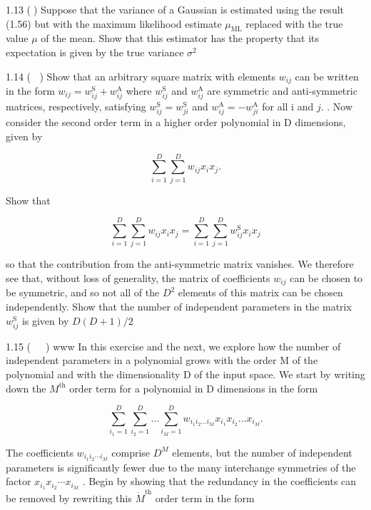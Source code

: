 \documentclass[
  10
]{article}
\begin{document}
1.13 () Suppose that the variance of a Gaussian is estimated using the
result (1.56) but with the maximum likelihood estimate
\(\mu _ { \mathrm { M L } }\) replaced with the true value \(\mu\) of
the mean. Show that this estimator has the property that its expectation
is given by the true variance \(\sigma ^ { 2 }\)

1.14 ( ) Show that an arbitrary square matrix with elements
\(w _ { i j }\) can be written in the form
\(w _ { i j } = w _ { i j } ^ { \mathrm { S } } + w _ { i j } ^ { \mathrm { A } }\)
where \(w _ { i j } ^ { \mathrm { S } }\) and
\(w _ { i j } ^ { \mathrm { A } }\) are symmetric and anti-symmetric
matrices, respectively, satisfying
\(w _ { i j } ^ { \mathrm { S } } = w _ { j i } ^ { \mathrm { S } }\)
and
\(w _ { i j } ^ { \mathrm { A } } = - w _ { j i } ^ { \mathrm { A } }\)
for all i and \(j .\) . Now consider the second order term in a higher
order polynomial in D dimensions, given by

\[
\sum_ {i = 1} ^ {D} \sum_ {j = 1} ^ {D} w _ {i j} x _ {i} x _ {j}.\tag{1.131}
\]

Show that

\[
\sum_ {i = 1} ^ {D} \sum_ {j = 1} ^ {D} w _ {i j} x _ {i} x _ {j} = \sum_ {i = 1} ^ {D} \sum_ {j = 1} ^ {D} w _ {i j} ^ {\mathrm{S}} x _ {i} x _ {j}\tag{1.132}
\]

so that the contribution from the anti-symmetric matrix vanishes. We
therefore see that, without loss of generality, the matrix of
coefficients \(w _ { i j }\) can be chosen to be symmetric, and so not
all of the \(D ^ { 2 }\) elements of this matrix can be chosen
independently. Show that the number of independent parameters in the
matrix \(w _ { i j } ^ { \mathrm { S } }\) is given by
\(D ( D + 1 ) / 2\)

1.15 (  ) www In this exercise and the next, we explore how the number
of independent parameters in a polynomial grows with the order M of the
polynomial and with the dimensionality D of the input space. We start by
writing down the \(M ^ { \mathrm { t h } }\) order term for a polynomial
in D dimensions in the form

\[
\sum_ {i _ {1} = 1} ^ {D} \sum_ {i _ {2} = 1} ^ {D} \dots \sum_ {i _ {M} = 1} ^ {D} w _ {i _ {1} i _ {2} \dots i _ {M}} x _ {i _ {1}} x _ {i _ {2}} \dots x _ {i _ {M}}.\tag{1.133}
\]

The coefficients \(w _ { i _ { 1 } i _ { 2 } \cdots i _ { M } }\)
comprise \(D ^ { M }\) elements, but the number of independent
parameters is significantly fewer due to the many interchange symmetries
of the factor
\(x _ { i _ { 1 } } x _ { i _ { 2 } } \cdots x _ { i _ { M } }\) . Begin
by showing that the redundancy in the coefficients can be removed by
rewriting this \(\dot { M } ^ { \mathrm { t h } }\) order term in the
form
\end{document}
